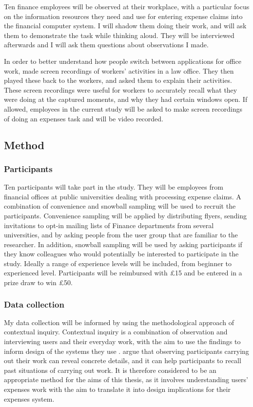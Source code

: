 \documentclass[11pt,oneside]{report}
\begin{document}
Ten finance employees will be observed at their workplace, with a particular focus on the information resources they need and use for entering expense claims into the financial computer system. I will shadow them doing their work, and will ask them to demonstrate the task while thinking aloud. They will be interviewed afterwards  and I will ask them questions about observations I made. 

In order to better understand how people switch between applications for office work, \citet{Cangiano2009} made screen recordings of workers' activities in a law office. They then played these back to the workers, and asked them to explain their activities. These screen recordings were useful for workers to accurately recall what they were doing at the captured moments, and why they had certain windows open. If allowed, employees in the current study will be asked to make screen recordings of doing an expenses task and will be video recorded. 

\subsection{Method}
\subsubsection{Participants}
Ten participants will take part in the study. They will be employees from financial offices at public universities dealing with processing expense claims. A combination of convenience and snowball sampling will be used to recruit the participants. Convenience sampling will be applied by distributing flyers, sending invitations to opt-in mailing lists of Finance departments from several universities, and by asking people from the user group that are familiar to the researcher. In addition, snowball sampling will be used by asking participants if they know colleagues who would potentially be interested to participate in the study. 
Ideally a range of experience levels will be included, from beginner to experienced level. Participants will be reimbursed with \pounds15 and be entered in a prize draw to win \pounds50. 

\subsubsection{Data collection}
My data collection will be informed by using the methodological approach of contextual inquiry.
Contextual inquiry is a combination of observation and interviewing users and their everyday work, with the aim to use the findings to inform design of the systems they use \citep{Beyer1998}.
\citet{Beyer1998} argue that observing participants carrying out their work can reveal concrete details, and it can help participants to recall past situations of carrying out work. It is therefore considered to be an appropriate method for the aims of this thesis, as it involves understanding users' expenses work with the aim to translate it into design implications for their expenses system. 
\end{document}
